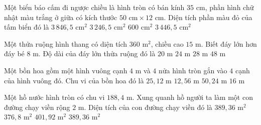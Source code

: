 \begin{ex} %
Một biển báo cấm đi ngược chiều là hình tròn có bán kính $35\text{ cm}$, phần hình chữ nhật màu trắng ở giữa có kích thước $50\text{ cm} \times 12\text{ cm}$. Diện tích phần màu đỏ của tấm biển đó là
\choice
{$3\,846{,}5\text{ cm}^2$}
{\True $3\,246{,}5\text{ cm}^2$}
{$600\text{ cm}^2$}
{$3\,446{,}5\text{ cm}^2$}
\end{ex}

\begin{ex} %
Một thửa ruộng hình thang có diện tích $360\text{ m}^2$, chiều cao $15\text{ m}$. Biết đáy lớn hơn đáy bé $8\text{ m}$. Độ dài của đáy lớn thửa ruộng đó là
\choice
{$20\text{ m}$}
{$24\text{ m}$}
{\True $28\text{ m}$}
{$48\text{ m}$}
\end{ex}

\begin{ex} %
Một bồn hoa gồm một hình vuông cạnh $4\text{ m}$ và $4$ nửa hình tròn gắn vào $4$ cạnh của hình vuông đó. Chu vi của bồn hoa đó là
\choice
{\True $25{,}12\text{ m}$}
{$12{,}56\text{ m}$}
{$50{,}24\text{ m}$}
{$16\text{ m}$}
\end{ex}

\begin{ex} %
Một hồ nước hình tròn có chu vi $188{,}4\text{ m}$. Xung quanh hồ người ta làm một con đường chạy viền rộng $2\text{ m}$. Diện tích của con đường chạy viền đó là
\choice
{$389{,}36\text{ m}^2$}
{$376{,}8\text{ m}^2$}
{$401{,}92\text{ m}^2$}
{\True $389{,}36\text{ m}^2$}
\end{ex}


